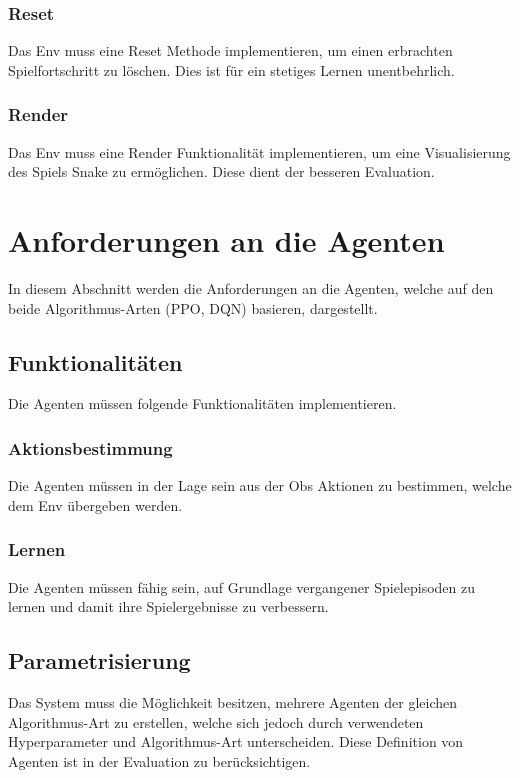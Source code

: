 \subsubsection{Reset} \label{sec:Anforderung_Reset}
Das Env muss eine Reset Methode implementieren, um einen erbrachten Spielfortschritt zu löschen. Dies ist für ein stetiges Lernen unentbehrlich.

\subsubsection{Render} \label{sec:visualisierung_Env}
Das Env muss eine Render Funktionalität implementieren, um eine Visualisierung des Spiels Snake zu ermöglichen. Diese dient der besseren Evaluation.

\section{Anforderungen an die Agenten}
In diesem Abschnitt werden die Anforderungen an die Agenten, welche auf den beide Algorithmus-Arten (PPO, DQN) basieren, dargestellt.

\subsection{Funktionalitäten} \label{sec:Agent_Funktionalitäten}
Die Agenten müssen folgende Funktionalitäten implementieren.

\subsubsection{Aktionsbestimmung}
Die Agenten müssen in der Lage sein aus der Obs Aktionen zu bestimmen, welche dem Env übergeben werden.

\subsubsection{Lernen}
Die Agenten müssen fähig sein, auf Grundlage vergangener Spielepisoden zu lernen und damit ihre Spielergebnisse zu verbessern.

\subsection{Parametrisierung} \label{sec:Anforderungen_Parametrisierung}
Das System muss die Möglichkeit besitzen, mehrere Agenten der gleichen Algorithmus-Art zu erstellen, welche sich jedoch durch verwendeten Hyperparameter und Algorithmus-Art unterscheiden. Diese Definition von Agenten ist in der Evaluation zu berücksichtigen.

